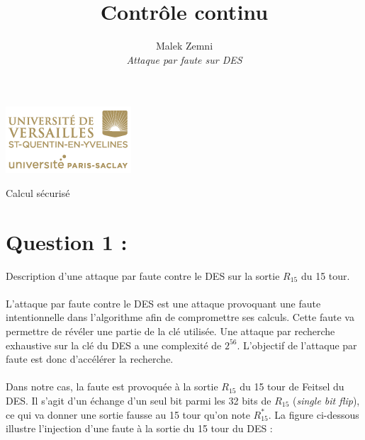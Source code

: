 

\title{\vspace{\fill}\textbf{\Huge Contrôle continu}}
\author{
	Malek Zemni
	\vspace{2em}\\
	\textit{Attaque par faute sur DES}
	\vspace{2em}
}




\clearpage
\maketitle\vspace{9em}
\begin{center}\includegraphics[scale=0.7]{logo.png}\end{center}
\begin{flushright}Calcul sécurisé\end{flushright}

\newpage\clearpage{}

	
	\section*{Question 1 :} 
		
		\noindent Description d'une attaque par faute contre le DES sur la sortie $R_{15}$ du 15 tour.
		
		\paragraph{} L'attaque par faute contre le DES est une attaque provoquant une faute intentionnelle dans l'algorithme afin de compromettre ses calculs. Cette faute va permettre de révéler une partie de la clé utilisée. Une attaque par recherche exhaustive sur la clé du DES a une complexité de $2^{56}$. L'objectif de l'attaque par faute est donc d'accélérer la recherche.
		
		\paragraph{} Dans notre cas, la faute est provoquée à la sortie $R_{15}$ du 15 tour de Feitsel du DES. Il s'agit d'un échange d'un seul bit parmi les 32 bits de $R_{15}$ (\textit{single bit flip}), ce qui va donner une sortie fausse au 15 tour qu'on note $R_{15}^{*}$. La figure ci-dessous illustre l'injection d'une faute à la sortie du 15 tour du DES :
		
